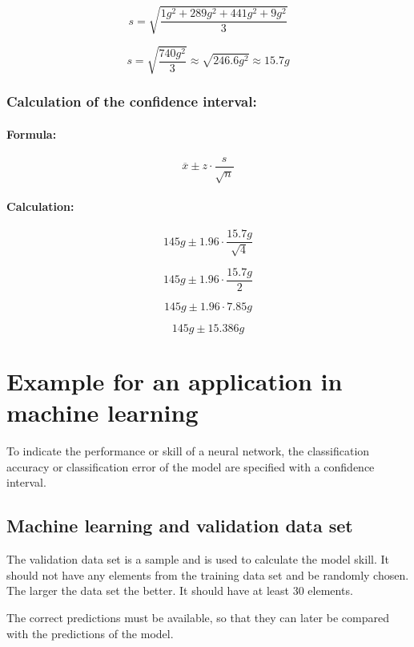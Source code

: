 \documentclass[a4paper,13pt,twoside]{book}
\begin{document}
$$
s =
\sqrt
{
\frac
{
1   g^{2} +
289 g^{2} +
441 g^{2} +
9   g^{2}
}
{3}
}
$$

$$
s =
\sqrt{\frac{740 g^{2}}{3}} \approx
\sqrt{246.6 g^{2}} \approx 15.7 g
$$



\subsubsection{Calculation of the confidence interval:}

\paragraph{Formula:}

$$
\overline{x} \pm 
z \cdot
\frac{s}{\sqrt{n}}
$$

\paragraph{Calculation:}

$$
145 g \pm 
1.96 \cdot
\frac{15.7 g}{\sqrt{4}}
$$

$$
145 g \pm 
1.96 \cdot
\frac{15.7 g}{2}
$$

$$
145 g \pm 
1.96 \cdot
7.85 g
$$

$$
145 g \pm 
15.386 g
$$



\section{Example for an application in machine learning}

To indicate the performance or skill of a neural network, the classification accuracy or classification error of the model are specified with a confidence interval.



\subsection{Machine learning and validation data set}

The validation data set is a sample and is used to calculate the model skill. It should not have any elements from the training data set and be randomly chosen. The larger the data set the better. It should have at least 30 elements.

The correct predictions must be available, so that they can later be compared with the predictions of the model.
\end{document}
